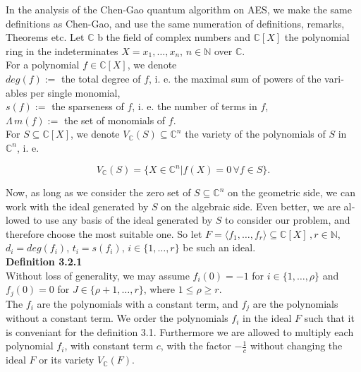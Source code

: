 \documentclass[a4paper,11pt]{article}
\begin{document}
\begin{otherlanguage}{english}
\noindent
In the analysis of the Chen-Gao quantum algorithm on \textsc{AES}, we make the same definitions as Chen-Gao, and use the same numeration of definitions, remarks, Theorems  etc. Let $\mathbb{C}$ b the field of complex numbers and $\mathbb{C}[X]$ the polynomial ring in the indeterminates $X = x_1, \ldots, x_n, \, n \in \mathbb{N}$ over $\mathbb{C}$. \\

\noindent
For a polynomial $f \in \mathbb{C}[X]$, we denote \\

\noindent
$deg(f) :=$ the total degree of $f$, i. e. the maximal sum of powers of the variables per single monomial,\\
\noindent
$s(f) :=$ the sparseness of $f$, i. e. the number of terms in $f$, \\
\noindent
$\Lambda \, m(f) :=$ the set of monomials of $f$. \\

\noindent
For $S \subseteq \mathbb{C}[X]$, we denote $V_{\mathbb{C}}(S) \subseteq \mathbb{C}^n$ the variety of the polynomials of $S$ in $\mathbb{C}^n$, i. e. 

$$V_{\mathbb{C}}(S) = \{ X \in \mathbb{C}^n | f(X) = 0 \, \forall f \in S\}.$$
\vspace{0.1cm}

\noindent
Now, as long as we consider the zero set of $S \subseteq \mathbb{C}^n$ on the geometric side, we can work with the ideal generated by $S$ on the algebraic side. Even better, we are allowed to use any basis of the ideal generated by $S$ to consider our problem, and therefore choose the most suitable one. So let $F = \langle f_1, \ldots, f_r \rangle \subseteq \mathbb{C}[X]\, , r \in \mathbb{N}$, $d_i = deg(f_i)$, $t_i = s(f_i), \, i \in \{1, \ldots, r\}$ be such an ideal.\\

\noindent
\textbf{Definition 3.2.1}\\
Without loss of generality, we may assume $f_i(0) = -1$ for $i \in \{1, \ldots, \rho \}$ and $f_j(0) = 0$ for $J \in \{\rho + 1, \ldots, r \}$, where $1 \leq \rho \geq r$. \\

\noindent
The $f_i$ are the polynomials with a constant term, and $f_j$ are the polynomials without a constant term. We order the polynomials $f_i$ in the ideal $F$ such that it is conveniant for the definition 3.1. Furthermore we are allowed to multiply each polynomial $f_i$, with constant term $c$, with the factor $-\frac{1}{c}$ without changing the ideal $F$ or its variety $V_\mathbb{C}(F)$.\\



\end{otherlanguage}
\end{document}
